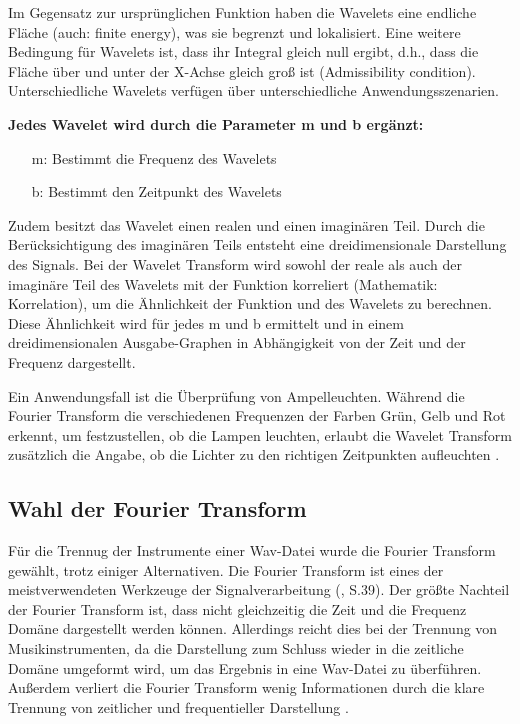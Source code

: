 Im Gegensatz zur ursprünglichen Funktion haben die Wavelets eine endliche Fläche (auch: finite energy), was sie begrenzt und lokalisiert. Eine weitere Bedingung für Wavelets ist, dass ihr Integral gleich null ergibt, d.h., dass die Fläche über und unter der X-Achse gleich groß ist (Admissibility condition). Unterschiedliche Wavelets verfügen über unterschiedliche Anwendungsszenarien.

\par

\textbf{Jedes Wavelet wird durch die Parameter m und b ergänzt:}

%
\begin{itemize}
    \item[m:] Bestimmt die Frequenz des Wavelets
    \item[b:] Bestimmt den Zeitpunkt des Wavelets
\end{itemize}
%

Zudem besitzt das Wavelet einen realen und einen imaginären Teil. Durch die Berücksichtigung des imaginären Teils entsteht eine dreidimensionale Darstellung des Signals. Bei der Wavelet Transform wird sowohl der reale als auch der imaginäre Teil des Wavelets mit der Funktion korreliert (Mathematik: Korrelation), um die Ähnlichkeit der Funktion und des Wavelets zu berechnen. Diese Ähnlichkeit wird für jedes m und b ermittelt und in einem dreidimensionalen Ausgabe-Graphen in Abhängigkeit von der Zeit und der Frequenz dargestellt.

\par

Ein Anwendungsfall ist die Überprüfung von Ampelleuchten. Während die Fourier Transform die verschiedenen Frequenzen der Farben Grün, Gelb und Rot erkennt, um festzustellen, ob die Lampen leuchten, erlaubt die Wavelet Transform zusätzlich die Angabe, ob die Lichter zu den richtigen Zeitpunkten aufleuchten \parencite{wavelets}.

%
\subsection{Wahl der Fourier Transform}
%

Für die Trennug der Instrumente einer Wav-Datei wurde die Fourier Transform gewählt, trotz einiger Alternativen. Die Fourier Transform ist eines der meistverwendeten Werkzeuge der Signalverarbeitung (\cite{fundamentals_of_music_processing}, S.39). Der größte Nachteil der Fourier Transform ist, dass nicht gleichzeitig die Zeit und die Frequenz Domäne dargestellt werden können. Allerdings reicht dies bei der Trennung von Musikinstrumenten, da die Darstellung zum Schluss wieder in die zeitliche Domäne umgeformt wird, um das Ergebnis in eine Wav-Datei zu überführen. Außerdem verliert die Fourier Transform wenig Informationen durch die klare Trennung von zeitlicher und frequentieller Darstellung \parencite{Parsons_2000}.

